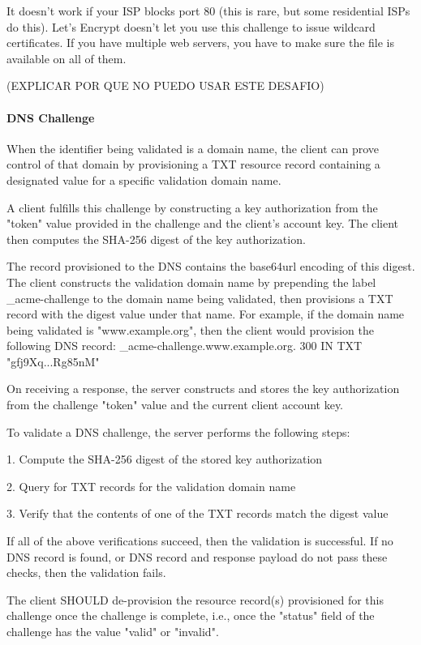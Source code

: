     It doesn’t work if your ISP blocks port 80 (this is rare, but some residential ISPs do this).
    Let’s Encrypt doesn’t let you use this challenge to issue wildcard certificates.
    If you have multiple web servers, you have to make sure the file is available on all of them.

   (EXPLICAR POR QUE NO PUEDO USAR ESTE DESAFIO)

\paragraph*{DNS Challenge}
   When the identifier being validated is a domain name, the client can
   prove control of that domain by provisioning a TXT resource record
   containing a designated value for a specific validation domain name.

   A client fulfills this challenge by constructing a key authorization
   from the "token" value provided in the challenge and the client's
   account key.  The client then computes the SHA-256 digest 
   of the key authorization.

   The record provisioned to the DNS contains the base64url encoding of
   this digest.  The client constructs the validation domain name by
   prepending the label {\_acme-challenge} to the domain name being
   validated, then provisions a TXT record with the digest value under
   that name.  For example, if the domain name being validated is
   "www.example.org", then the client would provision the following DNS
   record:
   \_acme-challenge.www.example.org. 300 IN TXT "gfj9Xq...Rg85nM"
   
   On receiving a response, the server constructs and stores the key
   authorization from the challenge "token" value and the current client
   account key.

   To validate a DNS challenge, the server performs the following steps:

   1.  Compute the SHA-256 digest of the stored key
       authorization

   2.  Query for TXT records for the validation domain name

   3.  Verify that the contents of one of the TXT records match the
       digest value

   If all of the above verifications succeed, then the validation is
   successful.  If no DNS record is found, or DNS record and response
   payload do not pass these checks, then the validation fails.

   The client SHOULD de-provision the resource record(s) provisioned for
   this challenge once the challenge is complete, i.e., once the
   "status" field of the challenge has the value "valid" or "invalid".
